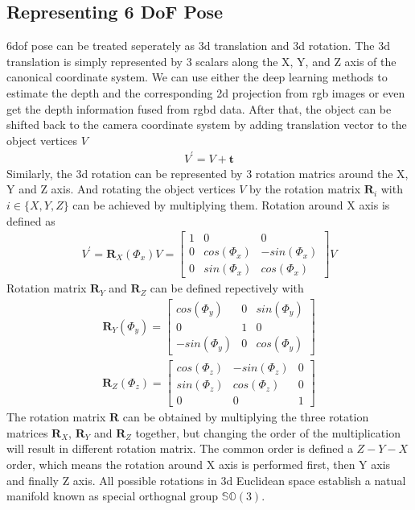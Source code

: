 \documentclass[12pt,DIV14,BCOR12mm,a4paper,footinclude=false,headinclude,parskip=half-,twoside,openright,cleardoublepage=empty,toc=index,bibliography=totoc,listof=totoc]{scrreprt}
\numberwithin{equation}{chapter}
\begin{document}
\subsection{Representing 6 DoF Pose}\label{sec:representation}
\gls{6dof} pose can be treated seperately as \gls{3d} translation and \gls{3d} rotation. The \gls{3d} translation is simply represented by 3 scalars along the X, Y, and Z axis of the canonical coordinate system. 
We can use either the deep learning methods to estimate the depth and the corresponding \gls{2d} projection from \gls{rgb} images or even get the depth information fused from \gls{rgbd} data\cite{DBLP:journals/corr/abs-1711-00199}. After that, the object can be shifted back to the camera coordinate system by adding translation vector to the object vertices $V$
\begin{align}
  V^{'} = V + \mathbf{t}
\end{align}
Similarly, the \gls{3d} rotation can be represented by 3 rotation matrics around the X, Y and Z axis. And rotating the object vertices $V$ by the rotation matrix $\mathbf{R}_{i}$ with $i\in \{X,Y,Z\}$ can be achieved by multiplying them. Rotation around X axis is defined as
\begin{align}
  V^{'} = \mathbf{R}_{X}(\Phi_{x})V = \begin{bmatrix}
    1 & 0 & 0 \\
    0 & cos(\Phi_{x}) & -sin(\Phi_{x}) \\
    0 & sin(\Phi_{x}) & cos(\Phi_{x})
  \end{bmatrix}V
\end{align}
Rotation matrix $\mathbf{R}_{Y}$ and $\mathbf{R}_{Z}$ can be defined repectively with
\begin{align}
  \mathbf{R}_{Y}(\Phi_{y}) = \begin{bmatrix}
    cos(\Phi_{y}) & 0 & sin(\Phi_{y}) \\
    0 & 1 & 0 \\
    -sin(\Phi_{y}) & 0 & cos(\Phi_{y})
  \end{bmatrix}
\end{align}
\begin{align}
  \mathbf{R}_{Z}(\Phi_{z}) = \begin{bmatrix}
    cos(\Phi_{z}) & -sin(\Phi_{z}) & 0 \\
    sin(\Phi_{z}) & cos(\Phi_{z}) & 0 \\
    0 & 0 & 1
  \end{bmatrix}
\end{align}
The rotation matrix $\mathbf{R}$ can be obtained by multiplying the three rotation matrices $\mathbf{R}_{X}$, $\mathbf{R}_{Y}$ and $\mathbf{R}_{Z}$ together, but changing the order of the multiplication will result in different rotation matrix. The common order is defined a $Z-Y-X$ order, which means the rotation around X axis is performed first, then Y axis and finally Z axis. All possible rotations in \gls{3d} Euclidean space establish a natual manifold known as special orthognal group $\mathbb{S} \mathbb{O} (3)$\cite{hashim2019special}.
\end{document}
